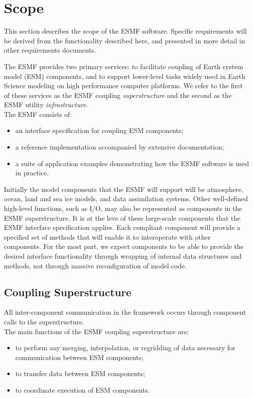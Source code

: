 \section{Scope}

This section describes the scope of the ESMF software. Specific
requirements will be derived from the functionality described here,
and presented in more detail in other requirements documents.

The ESMF provides two primary services: to facilitate 
coupling of Earth system model (ESM) components, and to support 
lower-level tasks widely used in Earth Science modeling on 
high performance computer platforms.  We refer to the first of these 
services as the ESMF coupling {\it superstructure} and the second 
as the ESMF utility {\it infrastructure}.\\

\noindent The ESMF consists of:
\begin{itemize}
\item an interface specification for coupling ESM components; 
\item a reference implementation accompanied by extensive documentation; 
\item a suite of application examples demonstrating how the 
ESMF software is used in practice.
\end{itemize}

Initially the model components that the ESMF will support will be atmosphere, 
ocean, land and sea ice models, and data assimilation systems.  Other 
well-defined high-level functions, such as I/O, may also be represented 
as components in the ESMF superstructure.  It is at the leve of these large-scale
components that the ESMF interface specification applies.  Each compliant
component will provide a specified set of methods that will enable it to 
interoperate with other components.  For the most part, we expect components
to be able to provide the desired interface functionality through wrapping
of internal data structures and methods, not through massive reconfiguration
of model code.

\subsection{Coupling Superstructure}

All inter-component communication in the framework occurs through 
component calls to the superstructure. \\

\noindent The main functions of the ESMF coupling superstructure are:
\begin{itemize}
\item to perform any merging, interpolation, or regridding 
of data necessary for communication between ESM components;
\item to transfer data between ESM components;
\item to coordinate execution of ESM components. 
\end{itemize}


